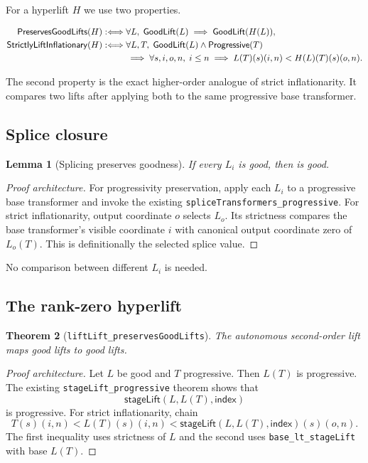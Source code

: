 \documentclass[11pt]{article}
\newtheorem{theorem}{Theorem}[section]
\newtheorem{lemma}[theorem]{Lemma}
\theoremstyle{definition}
\theoremstyle{remark}
\newcommand{\lean}[1]{\nolinkurl{#1}}
\newcommand{\leancode}[1]{\texttt{\detokenize{#1}}}
\newcommand{\Prog}{\mathsf{Progressive}}
\newcommand{\Good}{\mathsf{GoodLift}}
\begin{document}
For a hyperlift $H$ we use two properties.

\begin{align*}
\mathsf{PreservesGoodLifts}(H)
&:\Longleftrightarrow
  \forall L,\;\Good(L)\implies\Good(H(L)),\\
\mathsf{StrictlyLiftInflationary}(H)
&:\Longleftrightarrow
  \forall L,T,\;\Good(L)\wedge\Prog(T)\\
&\hspace{2.6em}\implies
  \forall s,i,o,n,\;i\le n\implies
  L(T)(s)(i,n)<H(L)(T)(s)(o,n).
\end{align*}

The second property is the exact higher-order analogue of strict inflationarity.
It compares two lifts after applying both to the same progressive base
transformer.

\subsection{Splice closure}

\begin{lemma}[Splicing preserves goodness]
If every $L_i$ is good, then \leancode{spliceLifts (fun i => L_i)} is good.
\end{lemma}

\begin{proof}[Proof architecture]
For progressivity preservation, apply each $L_i$ to a progressive base
transformer and invoke the existing \lean{spliceTransformers_progressive}.
For strict inflationarity, output coordinate $o$ selects $L_o$. Its strictness
compares the base transformer's visible coordinate $i$ with canonical output
coordinate zero of $L_o(T)$. This is definitionally the selected splice value.
\end{proof}

No comparison between different $L_i$ is needed.

\subsection{The rank-zero hyperlift}

\begin{theorem}[\lean{liftLift_preservesGoodLifts}]
The autonomous second-order lift maps good lifts to good lifts.
\end{theorem}

\begin{proof}[Proof architecture]
Let $L$ be good and $T$ progressive. Then $L(T)$ is progressive. The existing
\lean{stageLift_progressive} theorem shows that
\[
  \mathsf{stageLift}(L,L(T),\mathsf{index})
\]
is progressive. For strict inflationarity, chain
\[
  T(s)(i,n)<L(T)(s)(i,n)
  <\mathsf{stageLift}(L,L(T),\mathsf{index})(s)(o,n).
\]
The first inequality uses strictness of $L$ and the second uses
\lean{base_lt_stageLift} with base $L(T)$.
\end{proof}
\end{document}
